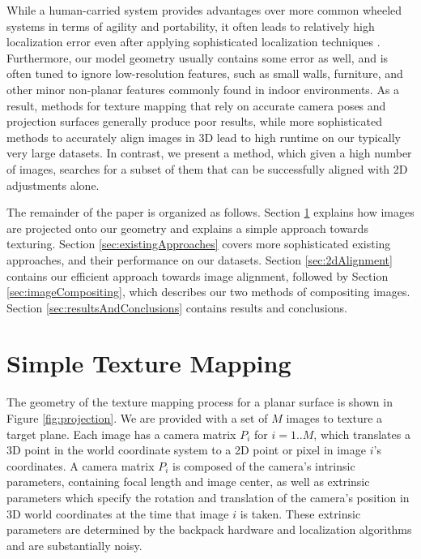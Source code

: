 \documentclass[]{spie}  %
\begin{document}
While a human-carried system provides advantages over more common
wheeled systems in terms of agility and portability, it often leads to
relatively high localization error even after applying sophisticated
localization techniques \cite{liu2010indoor}. Furthermore, our model
geometry usually contains some error as well, and is often tuned to
ignore low-resolution features, such as small walls, furniture, and
other minor non-planar features commonly found in indoor
environments. As a result, methods for texture mapping that rely on
accurate camera poses and projection surfaces generally produce poor
results, while more sophisticated methods to accurately align images
in 3D lead to high runtime on our typically very large datasets. In
contrast, we present a method, which given a high number of images,
searches for a subset of them that can be successfully aligned with 2D
adjustments alone.

The remainder of the paper is organized as follows. Section
\ref{sec:simpleTextureMapping} explains how images are projected onto
our geometry and explains a simple approach towards texturing. Section
\ref{sec:existingApproaches} covers more sophisticated existing
approaches, and their performance on our datasets. Section
\ref{sec:2dAlignment} contains our efficient approach towards image
alignment, followed by Section \ref{sec:imageCompositing}, which
describes our two methods of compositing images. Section
\ref{sec:resultsAndConclusions} contains results and conclusions.





\section{Simple Texture Mapping}
\label{sec:simpleTextureMapping}

The geometry of the texture mapping process for a planar surface is
shown in Figure \ref{fig:projection}.  We are provided with a set of
$M$ images to texture a target plane. Each image has a camera matrix
$P_i$ for $i=1..M$, which translates a 3D point in the world
coordinate system to a 2D point or pixel in image $i$'s coordinates. A
camera matrix $P_i$ is composed of the camera's intrinsic parameters,
containing focal length and image center, as well as extrinsic
parameters which specify the rotation and translation of the camera's
position in 3D world coordinates at the time that image $i$ is
taken. These extrinsic parameters are determined by the backpack
hardware and localization algorithms \cite{chen2010indoor,
  liu2010indoor, kua2012loopclosure} and are substantially noisy.
\end{document}
